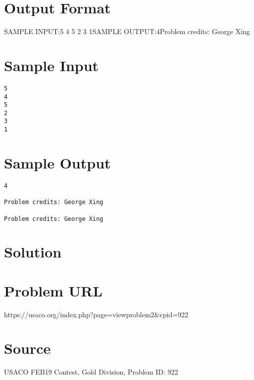 \documentclass[12pt]{article}
\begin{document}
\section*{Output Format}
SAMPLE INPUT:5
4
5
2
3
1SAMPLE OUTPUT:4Problem credits: George Xing

\section*{Sample Input}
\begin{verbatim}
5
4
5
2
3
1
\end{verbatim}

\section*{Sample Output}
\begin{verbatim}
4

Problem credits: George Xing

Problem credits: George Xing
\end{verbatim}

\section*{Solution}


\section*{Problem URL}
https://usaco.org/index.php?page=viewproblem2&cpid=922

\section*{Source}
USACO FEB19 Contest, Gold Division, Problem ID: 922
\end{document}
